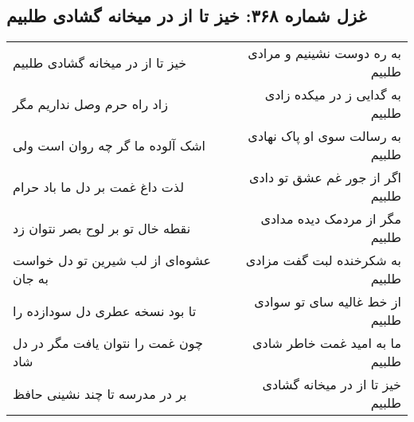 \begin{center}
\section*{غزل شماره ۳۶۸: خیز تا از در میخانه گشادی طلبیم}
\label{sec:sh368}
\begin{longtable}{l p{0.5cm} r}
خیز تا از در میخانه گشادی طلبیم
&&
به ره دوست نشینیم و مرادی طلبیم
\\
زاد راه حرم وصل نداریم مگر
&&
به گدایی ز در میکده زادی طلبیم
\\
اشک آلوده ما گر چه روان است ولی
&&
به رسالت سوی او پاک نهادی طلبیم
\\
لذت داغ غمت بر دل ما باد حرام
&&
اگر از جور غم عشق تو دادی طلبیم
\\
نقطه خال تو بر لوح بصر نتوان زد
&&
مگر از مردمک دیده مدادی طلبیم
\\
عشوه‌ای از لب شیرین تو دل خواست به جان
&&
به شکرخنده لبت گفت مزادی طلبیم
\\
تا بود نسخه عطری دل سودازده را
&&
از خط غالیه سای تو سوادی طلبیم
\\
چون غمت را نتوان یافت مگر در دل شاد
&&
ما به امید غمت خاطر شادی طلبیم
\\
بر در مدرسه تا چند نشینی حافظ
&&
خیز تا از در میخانه گشادی طلبیم
\\
\end{longtable}
\end{center}
